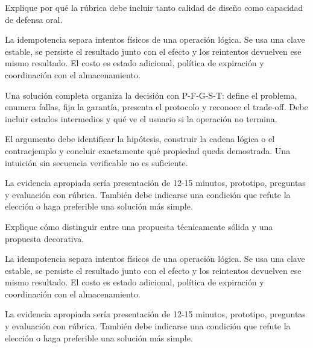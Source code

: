 \documentclass[variant=guia,cover=institutional,mode=screen]{ua-engineering-v6-article}
\begin{document}
\begin{uaexercise}
Explique por qué la rúbrica debe incluir tanto calidad de diseño como capacidad de defensa oral.
\end{uaexercise}
\begin{uaanswer}
La idempotencia separa intentos físicos de una operación lógica. Se usa una clave estable, se persiste el resultado junto con el efecto y los reintentos devuelven ese mismo resultado. El costo es estado adicional, política de expiración y coordinación con el almacenamiento.

Una solución completa organiza la decisión con P-F-G-S-T: define el problema, enumera fallas, fija la garantía, presenta el protocolo y reconoce el trade-off. Debe incluir estados intermedios y qué ve el usuario si la operación no termina.

El argumento debe identificar la hipótesis, construir la cadena lógica o el contraejemplo y concluir exactamente qué propiedad queda demostrada. Una intuición sin secuencia verificable no es suficiente.

La evidencia apropiada sería presentación de 12-15 minutos, prototipo, preguntas y evaluación con rúbrica. También debe indicarse una condición que refute la elección o haga preferible una solución más simple.
\end{uaanswer}

\begin{uaexercise}
Explique cómo distinguir entre una propuesta técnicamente sólida y una propuesta decorativa.
\end{uaexercise}
\begin{uaanswer}
La idempotencia separa intentos físicos de una operación lógica. Se usa una clave estable, se persiste el resultado junto con el efecto y los reintentos devuelven ese mismo resultado. El costo es estado adicional, política de expiración y coordinación con el almacenamiento.

La evidencia apropiada sería presentación de 12-15 minutos, prototipo, preguntas y evaluación con rúbrica. También debe indicarse una condición que refute la elección o haga preferible una solución más simple.
\end{uaanswer}
\end{document}
